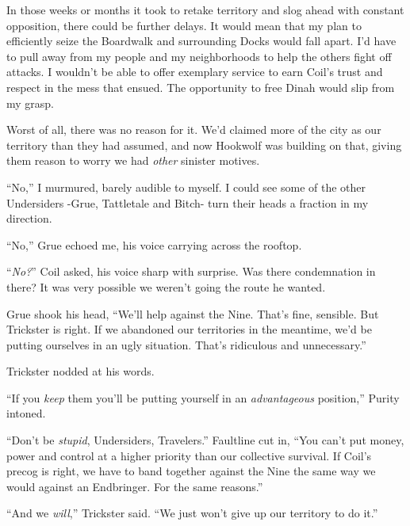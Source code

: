 In those weeks or months it took to retake territory and slog ahead with constant opposition, there could be further delays.  It would mean that my plan to efficiently seize the Boardwalk and surrounding Docks would fall apart.  I'd have to pull away from my people and my neighborhoods to help the others fight off attacks.  I wouldn't be able to offer exemplary service to earn Coil's trust and respect in the mess that ensued.  The opportunity to free Dinah would slip from my grasp.



Worst of all, there was no reason for it.  We'd claimed more of the city as our territory than they had assumed, and now Hookwolf was building on that, giving them reason to worry we had \emph{other} sinister motives.



``No,'' I murmured, barely audible to myself.  I could see some of the other Undersiders -Grue, Tattletale and Bitch- turn their heads a fraction in my direction.



``No,'' Grue echoed me, his voice carrying across the rooftop.



``\emph{No?}'' Coil asked, his voice sharp with surprise.  Was there condemnation in there?  It was  very possible we weren't going the route he wanted.



Grue shook his head, ``We'll help against the Nine.  That's fine, sensible.  But Trickster is right.  If we abandoned our territories in the meantime, we'd be putting ourselves in an ugly situation.  That's ridiculous and unnecessary.''



Trickster nodded at his words.



``If you \emph{keep} them you'll be putting yourself in an \emph{advantageous} position,'' Purity intoned.



``Don't be \emph{stupid}, Undersiders, Travelers.'' Faultline cut in, ``You can't put money, power and control at a higher priority than our collective survival.  If Coil's precog is right, we have to band together against the Nine the same way we would against an Endbringer.  For the same reasons.''



``And we \emph{will},'' Trickster said.  ``We just won't give up our territory to do it.''



